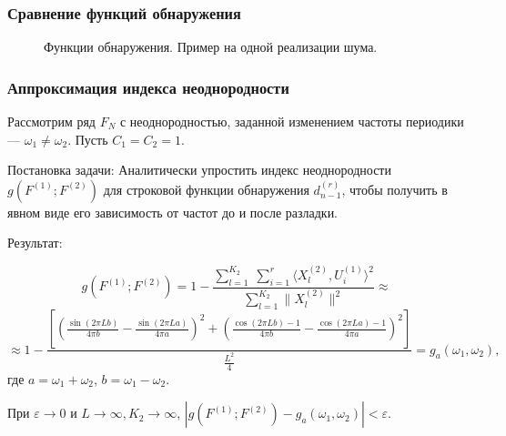 \documentclass[pdf, 9pt,intlimits, unicode]{beamer}
\begin{document}
	\begin{frame}
		\frametitle{Сравнение функций обнаружения}
		\begin{figure}[!hhh]
			\caption{Функции обнаружения. Пример на одной реализации шума.}
			\label{pic:heter_funcs}
		\end{figure}
	\end{frame}

	\begin{frame}
		\frametitle{Аппроксимация индекса неоднородности}
		Рассмотрим ряд $ F_N $ с неоднородностью, заданной изменением частоты периодики --- $ \omega_1 \neq \omega_2 $. Пусть $ C_1 = C_2 = 1 $.
		
		\bigskip
		{\color{blue} Постановка задачи:}
		Аналитически упростить индекс неоднородности $ g(F^{(1)}; F^{(2)}) $ для строковой функции обнаружения $ d_{n-1}^{(r)} $, чтобы получить в явном виде его зависимость от частот до и после разладки.
		
		\bigskip
		{\color{blue} Результат:}
		
		$$ g(F^{(1)}; F^{(2)}) = 1 - \frac{\sum\limits_{l=1}^{K_2}\;\sum\limits_{i=1}^{r}\langle X_l^{(2)}, U_i^{(1)}\rangle^2}{\sum\limits_{l=1}^{K_2}\|X_l^{(2)}\|^2} \approx $$
		$$ \approx 1 - \frac{\left[ \left(  \frac{\sin(2\pi Lb)}{4\pi b} - \frac{\sin(2\pi La)}{4\pi a}   \right)^2 + \left(  \frac{\cos(2\pi Lb) - 1}{4\pi b} - \frac{\cos(2\pi La) - 1}{4\pi a}  \right)^2 \right]}{\frac{L^2}{4}} = g_a(\omega_1, \omega_2), $$
		где $ a = \omega_1 + \omega_2 $, $ b = \omega_1 - \omega_2 $.
		
		При $ \varepsilon \rightarrow 0 $ и $ L \rightarrow \infty, K_2 \rightarrow \infty $, $ |g(F^{(1)}; F^{(2)}) - g_a(\omega_1, \omega_2)| < \varepsilon $.
	\end{frame}
	
\end{document}
